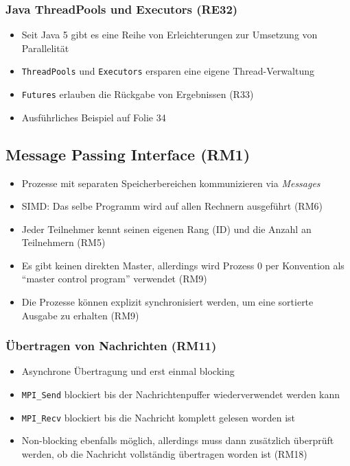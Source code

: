 \subsubsection{Java ThreadPools und Executors (RE32)}
\begin{itemize}
	\item Seit Java 5 gibt es eine Reihe von Erleichterungen zur Umsetzung von Parallelität
	\item \texttt{ThreadPools} und \texttt{Executors} ersparen eine eigene Thread-Verwaltung
	\item \texttt{Futures} erlauben die Rückgabe von Ergebnissen (R33)
	\item Ausführliches Beispiel auf Folie 34
\end{itemize}


\subsection{Message Passing Interface (RM1)}
\begin{itemize}
	\item Prozesse mit separaten Speicherbereichen kommunizieren via \textit{Messages}
	\item SIMD: Das selbe Programm wird auf allen Rechnern ausgeführt (RM6)
	\item Jeder Teilnehmer kennt seinen eigenen Rang (ID) und die Anzahl an Teilnehmern (RM5)
	\item Es gibt keinen direkten Master, allerdings wird Prozess 0 per Konvention als "`master control program"' verwendet (RM9)
	\item Die Prozesse können explizit synchronisiert werden, um eine sortierte Ausgabe zu erhalten (RM9)
\end{itemize}

\subsubsection{Übertragen von Nachrichten (RM11)}
\begin{itemize}
	\item Asynchrone Übertragung und erst einmal blocking
	\item \texttt{MPI\_Send} blockiert bis der Nachrichtenpuffer wiederverwendet werden kann
	\item \texttt{MPI\_Recv} blockiert bis die Nachricht komplett gelesen worden ist
	\item Non-blocking ebenfalls möglich, allerdings muss dann zusätzlich überprüft werden, ob die Nachricht vollständig übertragen worden ist (RM18)
\end{itemize}

